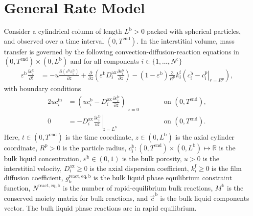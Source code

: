 \documentclass{article}
\begin{document}
\section*{General Rate Model}
Consider a cylindrical column of length $L^{\mathrm{b}} > 0$ packed with spherical particles, and observed over a time interval $(0, T^{\mathrm{end}})$.
In the interstitial volume, mass transfer is governed by the following convection-diffusion-reaction equations in $(0, T^{\mathrm{end}})\times (0, L^{\mathrm{b}})$ and for all components $i\in\{1, \dots, N^{\mathrm{c}} \}$
\begin{align}
    \varepsilon^{\mathrm{b}} \frac{\partial c^{\mathrm{b}}_{i}}{\partial t}
    &= - u \frac{\partial \left( \varepsilon^{\mathrm{b}} c^{\mathrm{b}}_{i} \right)}{\partial z}
        + \frac{\partial}{\partial z} \left( \varepsilon^{\mathrm{b}} D^{\mathrm{ax}}_{i} \frac{\partial c^{\mathrm{b}}_{i}}{\partial z} \right)
        - \left(1 - \varepsilon^{\mathrm{b}} \right) \frac{3}{R^{\mathrm{p}}} k^{\mathrm{f}}_{i} \left(c^{\mathrm{b}}_{i} - \left. c^{\mathrm{p}}_{i} \right|_{r = R^{\mathrm{p}}} \right),
\end{align}
with boundary conditions
\begin{alignat}{2}
    u c^{\mathrm{in}}_{i}
    &= \left.\left( u c^{\mathrm{b}}_{i} - D^{\mathrm{ax}}_{i} \frac{\partial c^{\mathrm{b}}_{i}}{\partial z}\right)\right|_{z=0}
    & & \qquad\text{on }(0, T^{\mathrm{end}}),
    \\
    0
    &= - D^{\mathrm{ax}}_{i} \left. \frac{\partial c^{\mathrm{b}}_{i}}{\partial z} \right|_{z=L^{\mathrm{b}}}
    & & \qquad\text{on }(0, T^{\mathrm{end}}).
\end{alignat}
Here, $t\in (0, T^{\mathrm{end}})$ is the time coordinate, $z\in (0, L^{\mathrm{b}})$ is the axial cylinder coordinate, $R^{\mathrm{p}}> 0$ is the particle radius, $c^{\mathrm{b}}_{i}\colon (0, T^{\mathrm{end}})\times (0, L^{\mathrm{b}}) \mapsto \mathbb{R}$ is the bulk liquid concentration, $\varepsilon^{\mathrm{b}}\in (0, 1)$ is the bulk porosity, $u> 0$ is the interstitial velocity, $D^{\mathrm{ax}}_{i}\geq 0$ is the axial dispersion coefficient, $k^{\mathrm{f}}_{i}\geq 0$ is the film diffusion coefficient, $g^{\mathrm{react,eq},\mathrm{b}}_{k}$ is the bulk liquid phase equilibrium constraint function, $N^{\mathrm{react,eq},\mathrm{b}}$ is the number of rapid-equilibrium bulk reactions, $M^{\mathrm{b}}$ is the conserved moiety matrix for bulk reactions, and $\vec{c}^{\mathrm{b}}$ is the bulk liquid components vector.
The bulk liquid phase reactions are in rapid equilibrium.
\end{document}
